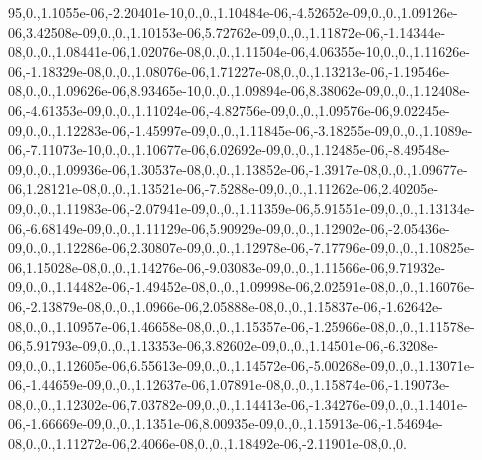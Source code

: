 {95,0.,1.\-1055e-\/06,-\/2.\-20401e-\/10,0.,0.,1.\-10484e-\/06,-\/4.\-52652e-\/09,0.,0.,1.\-09126e-\/06,3.\-42508e-\/09,0.,0.,1.\-10153e-\/06,5.\-72762e-\/09,0.,0.,1.\-11872e-\/06,-\/1.\-14344e-\/08,0.,0.,1.\-08441e-\/06,1.\-02076e-\/08,0.,0.,1.\-11504e-\/06,4.\-06355e-\/10,0.,0.,1.\-11626e-\/06,-\/1.\-18329e-\/08,0.,0.,1.\-08076e-\/06,1.\-71227e-\/08,0.,0.,1.\-13213e-\/06,-\/1.\-19546e-\/08,0.,0.,1.\-09626e-\/06,8.\-93465e-\/10,0.,0.,1.\-09894e-\/06,8.\-38062e-\/09,0.,0.,1.\-12408e-\/06,-\/4.\-61353e-\/09,0.,0.,1.\-11024e-\/06,-\/4.\-82756e-\/09,0.,0.,1.\-09576e-\/06,9.\-02245e-\/09,0.,0.,1.\-12283e-\/06,-\/1.\-45997e-\/09,0.,0.,1.\-11845e-\/06,-\/3.\-18255e-\/09,0.,0.,1.\-1089e-\/06,-\/7.\-11073e-\/10,0.,0.,1.\-10677e-\/06,6.\-02692e-\/09,0.,0.,1.\-12485e-\/06,-\/8.\-49548e-\/09,0.,0.,1.\-09936e-\/06,1.\-30537e-\/08,0.,0.,1.\-13852e-\/06,-\/1.\-3917e-\/08,0.,0.,1.\-09677e-\/06,1.\-28121e-\/08,0.,0.,1.\-13521e-\/06,-\/7.\-5288e-\/09,0.,0.,1.\-11262e-\/06,2.\-40205e-\/09,0.,0.,1.\-11983e-\/06,-\/2.\-07941e-\/09,0.,0.,1.\-11359e-\/06,5.\-91551e-\/09,0.,0.,1.\-13134e-\/06,-\/6.\-68149e-\/09,0.,0.,1.\-11129e-\/06,5.\-90929e-\/09,0.,0.,1.\-12902e-\/06,-\/2.\-05436e-\/09,0.,0.,1.\-12286e-\/06,2.\-30807e-\/09,0.,0.,1.\-12978e-\/06,-\/7.\-17796e-\/09,0.,0.,1.\-10825e-\/06,1.\-15028e-\/08,0.,0.,1.\-14276e-\/06,-\/9.\-03083e-\/09,0.,0.,1.\-11566e-\/06,9.\-71932e-\/09,0.,0.,1.\-14482e-\/06,-\/1.\-49452e-\/08,0.,0.,1.\-09998e-\/06,2.\-02591e-\/08,0.,0.,1.\-16076e-\/06,-\/2.\-13879e-\/08,0.,0.,1.\-0966e-\/06,2.\-05888e-\/08,0.,0.,1.\-15837e-\/06,-\/1.\-62642e-\/08,0.,0.,1.\-10957e-\/06,1.\-46658e-\/08,0.,0.,1.\-15357e-\/06,-\/1.\-25966e-\/08,0.,0.,1.\-11578e-\/06,5.\-91793e-\/09,0.,0.,1.\-13353e-\/06,3.\-82602e-\/09,0.,0.,1.\-14501e-\/06,-\/6.\-3208e-\/09,0.,0.,1.\-12605e-\/06,6.\-55613e-\/09,0.,0.,1.\-14572e-\/06,-\/5.\-00268e-\/09,0.,0.,1.\-13071e-\/06,-\/1.\-44659e-\/09,0.,0.,1.\-12637e-\/06,1.\-07891e-\/08,0.,0.,1.\-15874e-\/06,-\/1.\-19073e-\/08,0.,0.,1.\-12302e-\/06,7.\-03782e-\/09,0.,0.,1.\-14413e-\/06,-\/1.\-34276e-\/09,0.,0.,1.\-1401e-\/06,-\/1.\-66669e-\/09,0.,0.,1.\-1351e-\/06,8.\-00935e-\/09,0.,0.,1.\-15913e-\/06,-\/1.\-54694e-\/08,0.,0.,1.\-11272e-\/06,2.\-4066e-\/08,0.,0.,1.\-18492e-\/06,-\/2.\-11901e-\/08,0.,0.}
